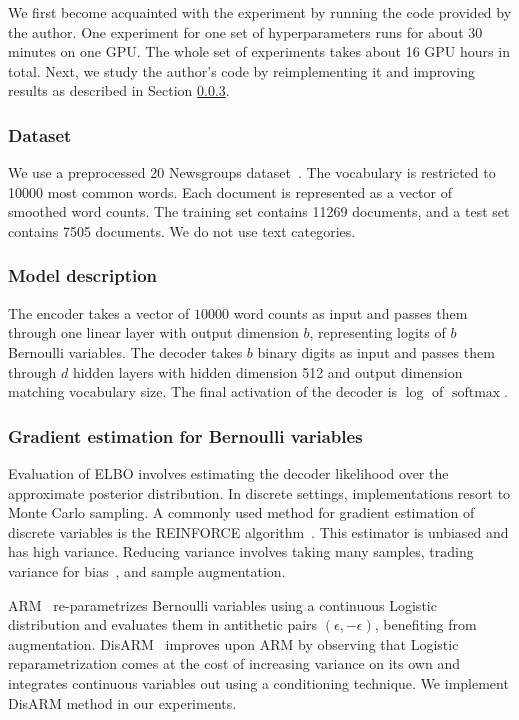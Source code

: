 We first become acquainted with the experiment by running the code provided by the author. One experiment for one set of hyperparameters runs for about 30 minutes on one GPU. The whole set of experiments takes about 16 GPU hours in total. Next, we study the author's code by reimplementing it and improving results as described in Section \ref{sec:disarm}.

\subsubsection{Dataset}
We use a preprocessed 20 Newsgroups dataset~\cite{20ng}. The vocabulary is restricted to 10000 most common words. Each document is represented as a vector of smoothed word counts. The training set contains 11269 documents, and a test set contains 7505 documents. We do not use text categories.

\subsubsection{Model description}

The encoder takes a vector of $10000$ word counts as input and passes them through one linear layer with output dimension $b$, representing logits of $b$ Bernoulli variables. The decoder takes $b$ binary digits as input and passes them through $d$ hidden layers with hidden dimension 512 and output dimension matching vocabulary size. The final activation of the decoder is $\log$ of $\operatorname{softmax}$.

\subsubsection{Gradient estimation for Bernoulli variables}\label{sec:disarm}

Evaluation of ELBO involves estimating the decoder likelihood over the approximate posterior distribution. In discrete settings, implementations resort to Monte Carlo sampling. A commonly used method for gradient estimation of discrete variables is the REINFORCE algorithm~\cite{reinforce}. This estimator is unbiased and has high variance. Reducing variance involves taking many samples, trading variance for bias~\cite{Shekhovtsov2021BiasVarianceTI}, and sample augmentation.

ARM~\cite{arm} re-parametrizes Bernoulli variables using a continuous Logistic distribution and evaluates them in antithetic pairs $(\epsilon, -\epsilon)$, benefiting from augmentation. DisARM~\cite{disarm} improves upon ARM by observing that Logistic reparametrization comes at the cost of increasing variance on its own and integrates continuous variables out using a conditioning technique. We implement DisARM method in our experiments.

